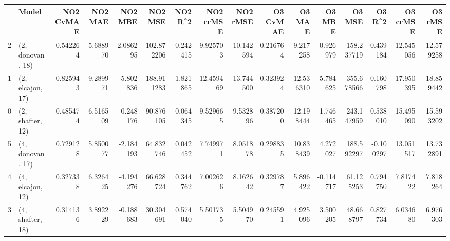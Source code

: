 \begin{tabular}{llrrrrrrrrrrrrrr}
\toprule
{} &             Model &  NO2 CvMAE &   NO2 MAE &   NO2 MBE &     NO2 MSE &   NO2 R\textasciicircum2 &  NO2 crMSE &   NO2 rMSE &  O3 CvMAE &     O3 MAE &    O3 MBE &      O3 MSE &    O3 R\textasciicircum2 &   O3 crMSE &    O3 rMSE \\
\midrule
2 &  (2, donovan, 18) &   0.542264 &  5.688970 &  2.086295 &  102.872206 &  0.242415 &   9.925703 &  10.142594 &  0.216764 &   9.217258 &  0.926979 &  158.237719 &  0.439184 &  12.545056 &  12.579258 \\
1 &  (2, elcajon, 17) &   0.825943 &  9.289971 & -5.802836 &  188.911283 & -1.821865 &  12.459469 &  13.744500 &  0.323924 &  12.536310 &  5.784625 &  355.678566 &  0.160798 &  17.950395 &  18.859442 \\
0 &  (2, shafter, 12) &   0.485474 &  6.516509 & -0.248176 &   90.876105 & -0.064345 &   9.529665 &   9.532896 &  0.387200 &  12.198444 &  1.746465 &  243.147959 &  0.538010 &  15.495090 &  15.593202 \\
5 &  (4, donovan, 17) &   0.729128 &  5.850077 & -2.184193 &   64.832746 &  0.042452 &   7.749971 &   8.051878 &  0.298835 &  10.838439 &  4.272027 &  188.592297 & -0.100297 &  13.051517 &  13.732891 \\
4 &  (4, elcajon, 12) &   0.327338 &  6.326425 & -4.194276 &   66.628724 &  0.344762 &   7.002626 &   8.162642 &  0.329787 &   5.896422 & -0.114717 &   61.125253 &  0.794750 &   7.817422 &   7.818264 \\
3 &  (4, shafter, 18) &   0.314136 &  3.892229 & -0.188683 &   30.304691 &  0.574040 &   5.501735 &   5.504970 &  0.245591 &   4.925096 &  3.500205 &   48.668797 &  0.827734 &   6.034680 &   6.976303 \\
\bottomrule
\end{tabular}
